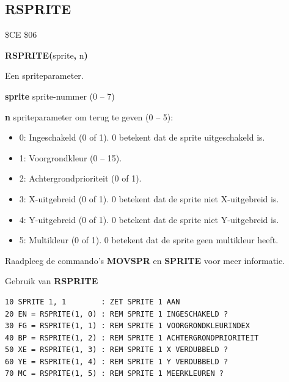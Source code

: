 \subsection{RSPRITE}
\begin{description}[leftmargin=2cm,style=nextline]
\item [Token:]    \$CE \$06

\item [Formaat:]   {\bf RSPRITE(}sprite{\bf,} n{\bf)}

\item [Retourneert:]  Een spriteparameter.

                  {\bf sprite} sprite-nummer (0 -- 7)

                  {\bf n} spriteparameter om terug te geven (0 -- 5):

                  \begin{itemize}
                     \item 0: Ingeschakeld (0 of 1). 0 betekent dat de sprite uitgeschakeld is.                     \item 1: Voorgrondkleur (0 -- 15).                     \item 2: Achtergrondprioriteit (0 of 1).                     \item 3: X-uitgebreid (0 of 1). 0 betekent dat de sprite niet X-uitgebreid is.                     \item 4: Y-uitgebreid (0 of 1). 0 betekent dat de sprite niet Y-uitgebreid is.                     \item 5: Multikleur (0 of 1). 0 betekent dat de sprite geen multikleur heeft.
                  \end{itemize}

\item [Opmerkingen:]  Raadpleeg de commando's {\bf MOVSPR} en {\bf SPRITE} voor meer informatie.

\item [Voorbeeld:]  Gebruik van {\bf RSPRITE}

\begin{tcolorbox}[colback=black,coltext=white]
\verbatimfont{\codefont}
\begin{verbatim}
10 SPRITE 1, 1        : ZET SPRITE 1 AAN
20 EN = RSPRITE(1, 0) : REM SPRITE 1 INGESCHAKELD ?
30 FG = RSPRITE(1, 1) : REM SPRITE 1 VOORGRONDKLEURINDEX
40 BP = RSPRITE(1, 2) : REM SPRITE 1 ACHTERGRONDPRIORITEIT
50 XE = RSPRITE(1, 3) : REM SPRITE 1 X VERDUBBELD ?
60 YE = RSPRITE(1, 4) : REM SPRITE 1 Y VERDUBBELD ?
70 MC = RSPRITE(1, 5) : REM SPRITE 1 MEERKLEUREN ?
\end{verbatim}
\end{tcolorbox}
\end{description}

